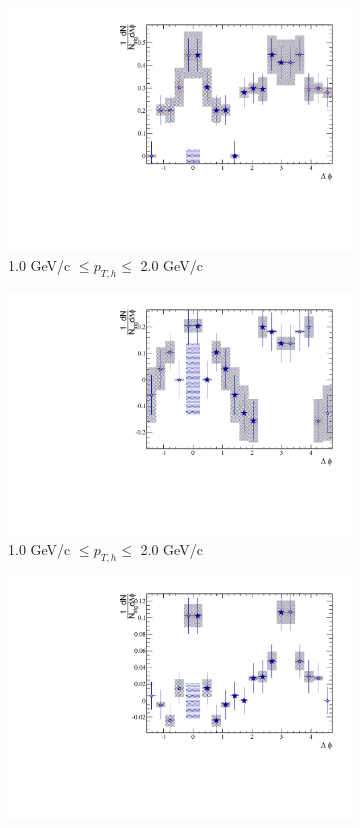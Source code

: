 \begin{figure}[htbp]
\begin{subfigure}{0.5\textwidth}
		\includegraphics[width=.9\textwidth]{Plots/Correlations/EP/subtracted/NPE_subtracted_eh_corr_inplane_primpt_4_5_cent_2_5_assopt_2_2.pdf}
		\caption{1.0 GeV/c $\leq p_{T,h} \leq$ 2.0 GeV/c}
		\label{fig:EP_corr_subtracted_c}
	\end{subfigure}	
	\begin{subfigure}{0.5\textwidth}
		\includegraphics[width=.9\textwidth]{Plots/Correlations/EP/subtracted/NPE_subtracted_eh_corr_outplane_primpt_4_5_cent_2_5_assopt_2_2.pdf}
		\caption{1.0 GeV/c $\leq p_{T,h} \leq$ 2.0 GeV/c}
		\label{fig:EP_corr_subtracted_d}
	\end{subfigure}	
	\begin{subfigure}{0.5\textwidth}
		\includegraphics[width=.9\textwidth]{Plots/Correlations/EP/subtracted/NPE_subtracted_eh_corr_inplane_primpt_4_5_cent_2_5_assopt_3_4.pdf}

\end{subfigure}
\end{figure}
